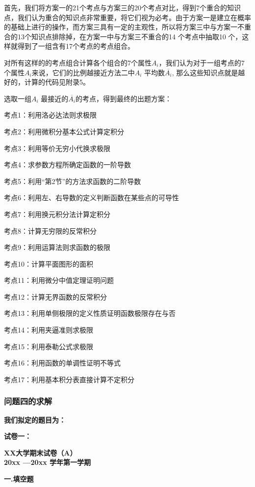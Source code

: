 \documentclass{ctexart}
\begin{document}
首先，我们将方案一的21个考点与方案三的20个考点对比，得到7个重合的知识点，我们认为重合的知识点非常重要，将它们视为必考。由于方案一是建立在概率的基础上进行的操作，而方案三具有一定的主观性，所以将方案三中与方案一不重合的13个知识点排除掉，在方案一中与方案三不重合的14 个考点中抽取10 个，这样就得到了一组含有17个考点的考点组合。

对所有这样的的考点组合计算各个组合的7个属性$A_{i}$，我们认为对于一组考点的7个属性$A_{i}$来说，它们的比例越接近方法二中$A_{i}$ 平均数$\overline{A_{i}}$, 那么这些知识点就是越好的，计算的代码见附录5。

选取一组$A_{i}$ 最接近的$\overline{A_{i}}$的考点，得到最终的出题方案：

考点1：利用洛必达法则求极限

考点2：利用微积分基本公式计算定积分

考点3：利用等价无穷小代换求极限

考点4：求参数方程所确定函数的一阶导数

考点5：利用“第2节”的方法求函数的二阶导数

考点6：利用左、右导数的定义判断函数在某些点的可导性

考点7：利用换元积分法计算定积分

考点8：计算无穷限的反常积分

考点9：利用运算法则求函数的极限

考点10：计算平面图形的面积

考点11：利用微分中值定理证明问题

考点12：计算无界函数的反常积分

考点13：利用单侧极限的定义性质证明函数极限存在与否

考点14：利用夹逼准则求极限

考点15：利用泰勒公式求极限

考点16：利用函数的单调性证明不等式

考点17：利用基本积分表直接计算不定积分


\subsubsection{问题四的求解}

\textbf{我们拟定的题目为：}

\textbf{试卷一：}
\begin{center}
\textbf{XX大学期末试卷（A）\\
20xx —20xx	学年第一学期\\}
\end{center}
\textbf{一.填空题}
\end{document}

